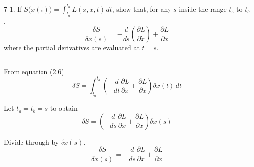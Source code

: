 \documentclass[12pt]{article}
\begin{document}
7-1.
If $S\big(x(t)\big)=\int_{t_a}^{t_b}L(\dot x,x,t)\,dt$, show that, for any
$s$ inside the range $t_a$ to $t_b$,
\begin{equation*}
\frac{\delta S}{\delta x(s)}=-\frac{d}{ds}\left(\frac{\partial L}{\partial\dot x}\right)
+\frac{\partial L}{\partial x}
\end{equation*}
where the partial derivatives are evaluated at $t=s$.

\bigskip
\hrule

\bigskip
From equation (2.6)
\begin{equation*}
\delta S=\int_{t_a}^{t_b}\left(-\frac{d}{dt}\frac{\partial L}{\partial\dot x}
+\frac{\partial L}{\partial x}\right)\delta x(t)\,dt
\end{equation*}

Let $t_a=t_b=s$ to obtain
\begin{equation*}
\delta S=\left(-\frac{d}{ds}\frac{\partial L}{\partial\dot x}
+\frac{\partial L}{\partial x}\right)\delta x(s)
\end{equation*}

Divide through by $\delta x(s)$.
\begin{equation*}
\frac{\delta S}{\delta x(s)}=
-\frac{d}{ds}\frac{\partial L}{\partial\dot x}
+\frac{\partial L}{\partial x}
\end{equation*}
\end{document}
